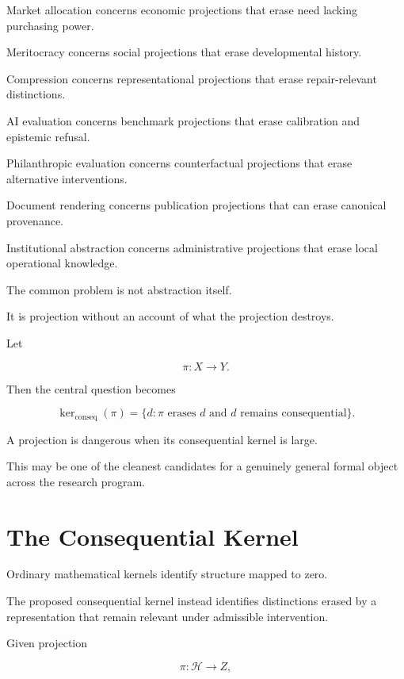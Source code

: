 \documentclass[11pt]{article}
\theoremstyle{remark}
\begin{document}
Market allocation concerns economic projections that erase need lacking purchasing power.

Meritocracy concerns social projections that erase developmental history.

Compression concerns representational projections that erase repair-relevant distinctions.

AI evaluation concerns benchmark projections that erase calibration and epistemic refusal.

Philanthropic evaluation concerns counterfactual projections that erase alternative interventions.

Document rendering concerns publication projections that can erase canonical provenance.

Institutional abstraction concerns administrative projections that erase local operational knowledge.

The common problem is not abstraction itself.

It is projection without an account of what the projection destroys.

Let

\begin{equation}
\pi:X\rightarrow Y.
\end{equation}

Then the central question becomes

\begin{equation}
\ker_{\mathrm{conseq}}(\pi)
=
\{
d:
\pi \text{ erases }d
\text{ and }d
\text{ remains consequential}
\}.
\end{equation}

A projection is dangerous when its consequential kernel is large.

This may be one of the cleanest candidates for a genuinely general formal object across the research program.

\section{The Consequential Kernel}

Ordinary mathematical kernels identify structure mapped to zero.

The proposed consequential kernel instead identifies distinctions erased by a representation that remain relevant under admissible intervention.

Given projection

\begin{equation}
\pi:\mathcal{H}\rightarrow Z,
\end{equation}
\end{document}
